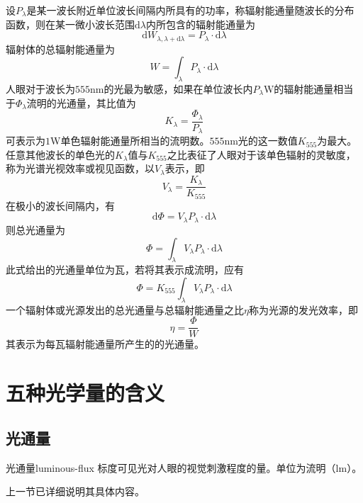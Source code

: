 \documentclass[cn,10pt,chinesefont=founder,math=newtx,cite=super,twoside]{elegantbook}
\begin{document}
设$P_\lambda$是某一波长附近单位波长间隔内所具有的功率，称辐射能通量随波长的分布函数，则在某一微小波长范围$\mathrm{d}\lambda$内所包含的辐射能通量为
\begin{equation}
\mathrm{d}W_{\lambda,\lambda+\mathrm{d}\lambda}=P_{\lambda}\cdot\mathrm{d}\lambda
\end{equation}
辐射体的总辐射能通量为
\begin{equation}
W=\int_{\lambda} P_{\lambda}\cdot\mathrm{d}\lambda
\end{equation}
人眼对于波长为$555$nm的光最为敏感，如果在单位波长内$P_{\lambda}$W的辐射能通量相当于$\varPhi_{\lambda}$流明的光通量，其比值为
\begin{equation}
K_{\lambda}=\frac{\varPhi_{\lambda}}{P_{\lambda}}
\end{equation}
可表示为$1$W单色辐射能通量所相当的流明数。$555$nm光的这一数值$K_{555}$为最大。任意其他波长的单色光的$K_{\lambda}$值与$K_{555}$之比表征了人眼对于该单色辐射的灵敏度，称为光谱光视效率或视见函数，以$V_{\lambda}$表示，即
\begin{equation}
V_{\lambda}=\frac{K_{\lambda}}{K_{555}}
\end{equation}
在极小的波长间隔内，有
\begin{equation}
\mathrm{d}\varPhi=V_{\lambda}P_{\lambda}\cdot\mathrm{d}\lambda
\end{equation}
则总光通量为
\begin{equation}
\varPhi=\int_{\lambda}V_{\lambda}P_{\lambda}\cdot\mathrm{d}\lambda
\end{equation}
此式给出的光通量单位为瓦，若将其表示成流明，应有
\begin{equation}
\varPhi=K_{555}\int_{\lambda}V_{\lambda}P_{\lambda}\cdot\mathrm{d}\lambda
\end{equation}
一个辐射体或光源发出的总光通量与总辐射能通量之比$\eta$称为光源的发光效率，即
\begin{equation}
\eta=\frac{\varPhi}{W}
\end{equation}
其表示为每瓦辐射能通量所产生的的光通量。

\section{五种光学量的含义}

\subsection{光通量}
\begin{definition}{光通量}{luminous-flux}
标度可见光对人眼的视觉刺激程度的量。单位为流明（$\mathrm{lm}$）。
\end{definition}
上一节已详细说明其具体内容。
\end{document}

